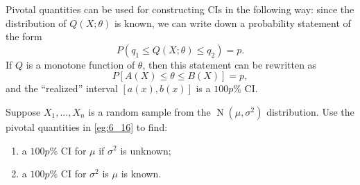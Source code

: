 \documentclass[notoc,notitlepage]{tufte-book}
\DeclareMathOperator{\Nor}{N }
\begin{document}
Pivotal quantities can be used for constructing CIs in the following way: since the distribution of $Q(X; \theta)$ is known, we can write down a probability statement of the form
\begin{equation*}
  P(q_1 \leq Q(X; \theta) \leq q_2) = p.
\end{equation*}
If $Q$ is a monotone function of $\theta$, then this statement can be rewritten as
\begin{equation*}
  P[ A(X) \leq \theta \leq B(X) ] = p,
\end{equation*}
and the ``realized'' interval $[a(x), b(x)]$ is a $100p\%$ CI.

\begin{eg}
  Suppose $X_1, ..., X_n$ is a random sample from the $\Nor(\mu, \sigma^2)$ distribution. Use the pivotal quantities in \cref{eg:6_16} to find:
  \begin{enumerate}
    \item a $100p\%$ CI for $\mu$ if $\sigma^2$ is unknown;
    \item a $100p\%$ CI for $\sigma^2$ is $\mu$ is known.
  \end{enumerate}
\end{eg}
\end{document}
